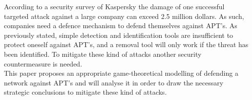  
According to a security survey of Kaspersky \cite{SurveyKaspersky}  the damage of one successful targeted attack against a large company can exceed 2.5 million dollars. As such, companies need a defence mechanism to defend themselves against APT's. As previously stated, simple detection and identification tools are insufficient to protect oneself against APT's, and a removal tool will only work if the threat has been identified. To mitigate these kind of attacks another security countermeasure is needed. \\
This paper proposes an appropriate game-theoretical modelling of defending a network against APT's and will analyse it in order to draw the necessary strategic conclusions to mitigate these kind of attacks.


